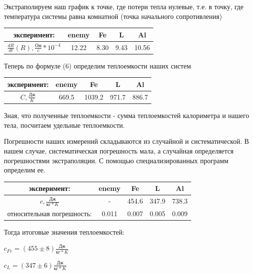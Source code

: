 \documentclass[12pt,a4paper]{article}
\begin{document}
Экстраполируем наш график к точке, где потери тепла нулевые, т.е. в точку, где температура системы равна комнатной (точка начального сопротивления)

\begin{table}[h!]
		\centering
		\begin{tabular}{|c|c|c|c|c|}
			\hline
			эксперимент: & enemy & Fe & L & Al \\ \hline
			 $\frac{dR}{dt}(R), \frac{\text{Ом}}{c} * 10^{-4}$  & 12.22 & 8.30 & 9.43 & 10.56 \\ \hline
		\end{tabular}
	\end{table}

Теперь по формуле (6) определим теплоемкости наших систем

\begin{table}[h!]
		\centering
		\begin{tabular}{|c|c|c|c|c|}
			\hline
			эксперимент: & enemy & Fe & L & Al \\ \hline
			 $C, \frac{\text{Дж}}{K}$  & 669.5 & 1039.2 & 971.7 & 886.7 \\ \hline
		\end{tabular}
	\end{table}

Зная, что полученные теплоемкости - сумма теплоемкостей калориметра и нашего тела, посчитаем удельные теплоемкости.

Погрешности наших измерений складываются из случайной и систематической. В нашем случае, систематическая погрешность мала, а случайная определяется погрешностями экстраполяции. С помощью специализированных программ определим ее.

\begin{table}[h!]
		\centering
		\begin{tabular}{|c|c|c|c|c|}
			\hline
			эксперимент: & enemy & Fe & L & Al \\ \hline
			 $c, \frac{\text{Дж}}{\text{кг}*K}$ & - & 454.6 & 347.9 & 738.3 \\ \hline
			 относительная погрешность: & 0.011 & 0.007 & 0.005 & 0.009 \\ \hline
		\end{tabular}
	\end{table}

Тогда итоговые значения теплоемкостей:

$c_{Fe} = (455 \pm 8)\frac{\text{Дж}}{\text{кг}*K}$

$c_{L} = (347 \pm 6)\frac{\text{Дж}}{\text{кг}*K}$
\end{document}
